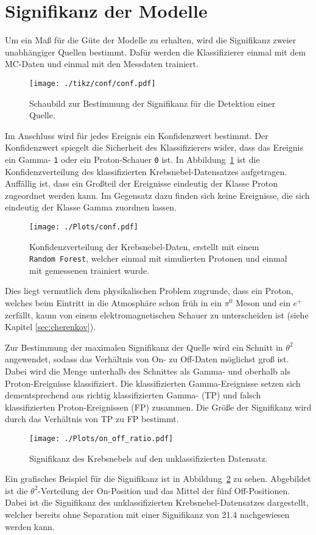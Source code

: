 \section{Signifikanz der Modelle}
Um ein Maß für die Güte der Modelle zu erhalten, wird die Signifikanz zweier unabhängiger Quellen bestimmt. 
Dafür werden die Klassifizierer einmal mit dem MC-Daten und einmal mit den Messdaten trainiert. 
\begin{figure}[H]
  \centering
  \texttt{[image: ./tikz/conf/conf.pdf]}
  \caption{Schaubild zur Bestimmung der Signifikanz für die Detektion einer Quelle.}
\end{figure}
Im Anschluss wird für jedes Ereignis ein Konfidenzwert bestimmt. 
Der Konfidenzwert spiegelt die Sicherheit des Klassifizierers wider, dass das Ereignis ein Gamma- \texttt{1} oder ein Proton-Schauer \texttt{0} ist. 
In Abbildung~\ref{fig:confdist} ist die Konfidenzverteilung des klassifizierten Krebsnebel-Datensatzes aufgetragen. 
Auffällig ist, dass ein Großteil der Ereignisse eindeutig der Klasse Proton zugeordnet werden kann. 
Im Gegensatz dazu finden sich keine Ereignisse, die sich eindeutig der Klasse Gamma zuordnen lassen.
\begin{figure}[H]
  \centering
  \texttt{[image: ./Plots/conf.pdf]}
  \caption{Konfidenzverteilung der Krebsnebel-Daten, erstellt mit einem \texttt{Random Forest}, welcher einmal mit simulierten Protonen und einmal mit gemessenen trainiert wurde.}
  \label{fig:confdist}
\end{figure}
Dies liegt vermutlich dem physikalischen Problem zugrunde, dass ein Proton, welches beim Eintritt in die Atmosphäre schon früh in ein $\pi^{0}$ Meson und ein $e^{+}$ zerfällt, kaum von einem elektromagnetischen Schauer zu unterscheiden ist (siehe Kapitel \ref{sec:cherenkov}).

Zur Bestimmung der maximalen Signifikanz der Quelle wird ein Schnitt in $\theta^{2}$ angewendet, sodass das Verhältnis von On- zu Off-Daten möglichst groß ist.
Dabei wird die Menge unterhalb des Schnittes als Gamma- und oberhalb als Proton-Ereignisse klassifiziert.
Die klassifizierten Gamma-Ereignisse setzen sich dementsprechend aus richtig klassifizierten Gamma- (TP) und falsch klassifizierten Proton-Ereignissen (FP) zusammen. 
Die Größe der Signifikanz wird durch das Verhältnis von TP zu FP bestimmt.
\begin{figure}[H]
  \centering
  \texttt{[image: ./Plots/on\_off\_ratio.pdf]}
  \caption{Signifikanz des Krebsnebels auf den unklassifizierten Datensatz.}
  \label{fig:sig_crab}
\end{figure}
Ein grafisches Beispiel für die Signifikanz ist in Abbildung~\ref{fig:sig_crab} zu sehen. 
Abgebildet ist die $\theta^{2}$-Verteilung der On-Position und das Mittel der fünf Off-Positionen.
Dabei ist die Signifikanz des unklassifizierten Krebsnebel-Datensatzes dargestellt, welcher bereits ohne Separation mit einer Signifikanz von \SI{21,4}{\sigma} nachgewiesen werden kann.

